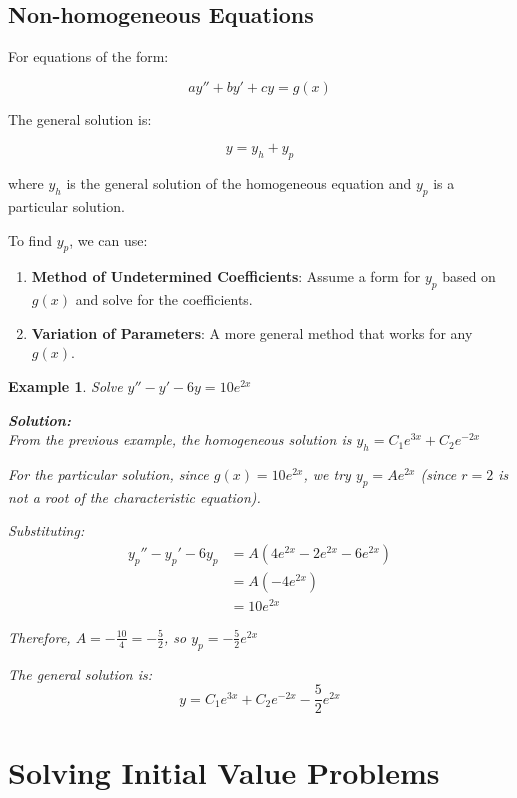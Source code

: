\documentclass{article}
\newtheorem{example}{Example}
\begin{document}
\subsection{Non-homogeneous Equations}

For equations of the form:

\begin{equation}
ay'' + by' + cy = g(x)
\end{equation}

The general solution is:

\begin{equation}
y = y_h + y_p
\end{equation}

where $y_h$ is the general solution of the homogeneous equation and $y_p$ is a particular solution.

To find $y_p$, we can use:

\begin{enumerate}
\item \textbf{Method of Undetermined Coefficients}: Assume a form for $y_p$ based on $g(x)$ and solve for the coefficients.
\item \textbf{Variation of Parameters}: A more general method that works for any $g(x)$.
\end{enumerate}

\begin{example}
Solve $y'' - y' - 6y = 10e^{2x}$

\textbf{Solution:}\\
From the previous example, the homogeneous solution is $y_h = C_1e^{3x} + C_2e^{-2x}$

For the particular solution, since $g(x) = 10e^{2x}$, we try $y_p = Ae^{2x}$ (since $r = 2$ is not a root of the characteristic equation).

Substituting:
\begin{align}
y_p'' - y_p' - 6y_p &= A(4e^{2x} - 2e^{2x} - 6e^{2x})\\
&= A(-4e^{2x})\\
&= 10e^{2x}
\end{align}

Therefore, $A = -\frac{10}{4} = -\frac{5}{2}$, so $y_p = -\frac{5}{2}e^{2x}$

The general solution is:
\begin{equation}
y = C_1e^{3x} + C_2e^{-2x} - \frac{5}{2}e^{2x}
\end{equation}
\end{example}

\section{Solving Initial Value Problems}
\end{document}
